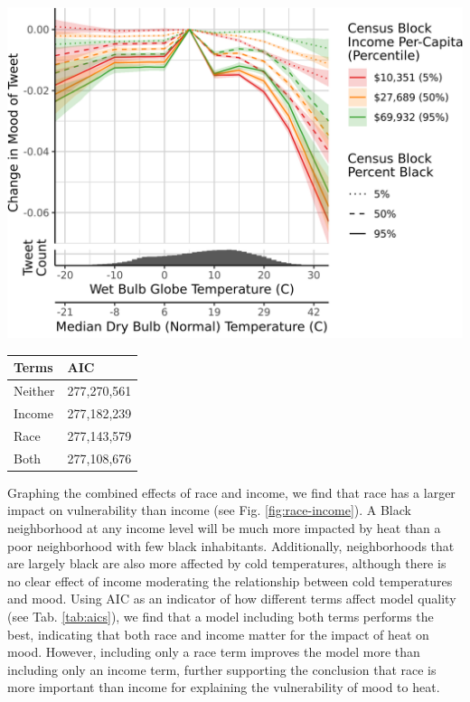 \documentclass{article}
\begin{document}
\begin{minipage}{.65\textwidth}
\centering
\includegraphics[width=\textwidth]{../res/wbgt-income-race.png}
\label{fig:race-income}
\end{minipage}\hfill
\begin{minipage}{.35\textwidth}
\centering
\begin{tabular}{| l | l |}
\hline
Terms & AIC \\
\hline
Neither & 277,270,561 \\
Income & 277,182,239 \\
Race & 277,143,579 \\
Both & 277,108,676 \\
\hline
\end{tabular}
\label{tab:aics}
\end{minipage}

Graphing the combined effects of race and income, we find that race has a larger impact on vulnerability than income (see Fig. \ref{fig:race-income}). A Black neighborhood at any income level will be much more impacted by heat than a poor neighborhood with few black inhabitants. Additionally, neighborhoods that are largely black are also more affected by cold temperatures, although there is no clear effect of income moderating the relationship between cold temperatures and mood. Using AIC as an indicator of how different terms affect model quality (see Tab. \ref{tab:aics}), we find that a model including both terms performs the best, indicating that both race and income matter for the impact of heat on mood. However, including only a race term improves the model more than including only an income term, further supporting the conclusion that race is more important than income for explaining the vulnerability of mood to heat.
\end{document}
